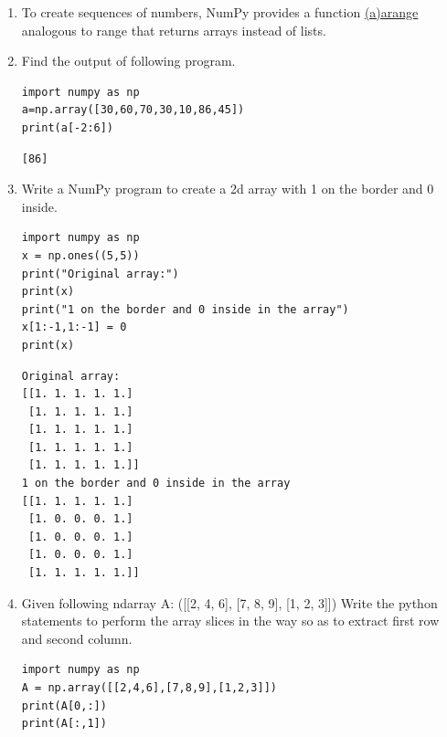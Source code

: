 \documentclass[11pt]{article}
\begin{document}
\begin{enumerate}
\begin{enumerate}
\begin{verbatim}
[[ 0  1  2 10 11 12]
 [ 3  4  5 13 14 15]
 [ 6  7  8 16 17 18]]
\end{verbatim}

\item Column wise
\begin{verbatim}
import numpy as np
Array1= np.array([[0,1,2],[3,4,5],[6,7,8]])
Array2= np.array([[10,11,12],[13,14,15],[16,17,18]])
carr=np.concatenate([Array1,Array2],axis=0)
print(carr)
\end{verbatim}

\begin{verbatim}
[[ 0  1  2]
 [ 3  4  5]
 [ 6  7  8]
 [10 11 12]
 [13 14 15]
 [16 17 18]]
\end{verbatim}
\end{enumerate}

\item To create sequences of numbers, NumPy provides a function \uline{(a)arange} analogous to range that returns arrays instead of lists.

\item Find the output of following program.
\begin{verbatim}
import numpy as np
a=np.array([30,60,70,30,10,86,45])
print(a[-2:6])
\end{verbatim}

\begin{verbatim}
[86]
\end{verbatim}

\item Write a NumPy program to create a 2d array with 1 on the border and 0 inside.
\begin{verbatim}
import numpy as np
x = np.ones((5,5))
print("Original array:")
print(x)
print("1 on the border and 0 inside in the array")
x[1:-1,1:-1] = 0
print(x)
\end{verbatim}

\begin{verbatim}
Original array:
[[1. 1. 1. 1. 1.]
 [1. 1. 1. 1. 1.]
 [1. 1. 1. 1. 1.]
 [1. 1. 1. 1. 1.]
 [1. 1. 1. 1. 1.]]
1 on the border and 0 inside in the array
[[1. 1. 1. 1. 1.]
 [1. 0. 0. 0. 1.]
 [1. 0. 0. 0. 1.]
 [1. 0. 0. 0. 1.]
 [1. 1. 1. 1. 1.]]
\end{verbatim}

\item Given following ndarray A: ([[2, 4, 6], [7, 8, 9], [1, 2, 3]])
Write the python statements to perform the array slices in the
way so as to extract first row and second column.
\begin{verbatim}
import numpy as np
A = np.array([[2,4,6],[7,8,9],[1,2,3]])
print(A[0,:])
print(A[:,1])
\end{verbatim}


\end{enumerate}
\end{document}
